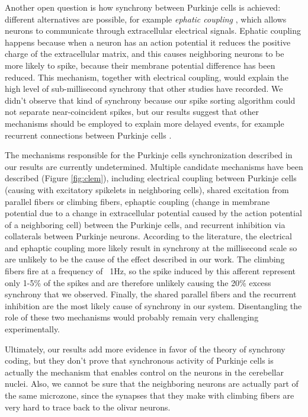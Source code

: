 Another open question is how synchrony between Purkinje cells is achieved: different alternatives are possible, for example \emph{ephatic coupling} \cite{han2018ephaptic}, which allows neurons to communicate through extracellular electrical signals. Ephatic coupling happens because when a neuron has an action potential it reduces the positive charge of the extracellular matrix, and this causes neighboring neurons to be more likely to spike, because their membrane potential difference has been reduced. This mechanism, together with electrical coupling, would explain the high level of sub-millisecond synchrony that other studies have recorded. We didn't observe that kind of synchrony because our spike sorting algorithm could not separate near-coincident spikes, but our results suggest that other mechanisms should be employed to explain more delayed events, for example recurrent connections between Purkinje cells \cite{de2008high}.

The mechanisms responsible for the Purkinje cells synchronization described in our results are currently undetermined. Multiple candidate mechanisms have been described \cite{person2012synchrony} (Figure \ref{fig:clem}), including electrical coupling between Purkinje cells (causing with excitatory spikelets in neighboring cells), shared excitation from parallel fibers or climbing fibers, ephaptic coupling (change in membrane potential due to a change in extracellular potential caused by the action potential of a neighboring cell) between the Purkinje cells, and recurrent inhibition via collaterals between Purkinje neurons. According to the literature, the electrical and ephaptic coupling more likely result in synchrony at the millisecond scale so are unlikely to be the cause of the effect described in our work. The climbing fibers fire at a frequency of ~1Hz, so the spike induced by this afferent represent only 1-5\% of the spikes and are therefore unlikely causing the 20\% excess synchrony that we observed. Finally, the shared parallel fibers and the recurrent inhibition are the most likely cause of synchrony in our system. Disentangling the role of these two mechanisms would probably remain very challenging experimentally.

Ultimately, our results add more evidence in favor of the theory of synchrony coding, but they don't prove that synchronous activity of Purkinje cells is actually the mechanism that enables control on the neurons in the cerebellar nuclei. Also, we cannot be sure that the neighboring neurons are actually part of the same microzone, since the synapses that they make with climbing fibers are very hard to trace back to the olivar neurons.

